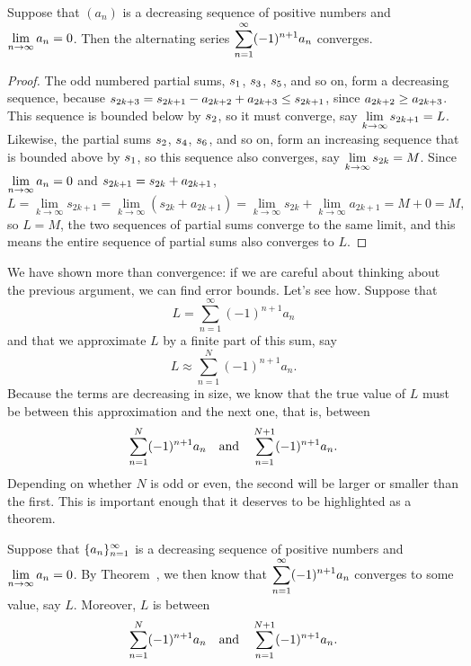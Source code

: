 \begin{theorem}
\label{thm:alternating-series-test}
Suppose that $(a_n)$ is a decreasing
sequence of positive numbers and $\displaystyle\lim_{n\to\infty}a_n=0$. Then the
alternating series $\displaystyle\sum_{n=1}^\infty (-1)^{n+1} a_n$ converges.
\end{theorem}



\begin{proof} The odd numbered partial sums, $\displaystyle s_1$, $\displaystyle s_3$, $\displaystyle s_5$,
and so on, form a decreasing sequence, because
$\displaystyle s_{2k+3}=s_{2k+1}-a_{2k+2}+a_{2k+3}\le s_{2k+1}$, since
$\displaystyle a_{2k+2}\ge a_{2k+3}$. This sequence is bounded below by
$\displaystyle s_2$, so it must converge, say 
$\displaystyle\lim_{k\to\infty}s_{2k+1}=L$.
Likewise, the partial sums $\displaystyle s_2$, $\displaystyle s_4$, $\displaystyle s_6$,
and so on, form an increasing sequence that is bounded above by
$\displaystyle s_1$, so this sequence also converges, say 
$\displaystyle\lim_{k\to\infty}s_{2k}=M$. Since $\displaystyle\lim_{n\to\infty} a_n=0$ and
$\displaystyle s_{2k+1}= s_{2k}+a_{2k+1}$,
$$
  L=\lim_{k\to\infty}s_{2k+1}=\lim_{k\to\infty}(s_{2k}+a_{2k+1})=
  \lim_{k\to\infty}s_{2k}+\lim_{k\to\infty}a_{2k+1}=M+0=M,
$$
so $L=M$, the two sequences of partial sums converge to the same
limit, and this means the entire sequence of partial sums also
converges to $L$.
\end{proof}

We have shown more than convergence: if we are careful about thinking
about the previous argument, we can find error bounds. Let's see
how. Suppose that
$$L=\sum_{n=1}^\infty (-1)^{n+1} a_n$$
and that we approximate $L$ by a finite part of this sum, say
$$L\approx \sum_{n=1}^N (-1)^{n+1} a_n.$$
Because the terms are decreasing in size, we know that the true value
of $L$ must be between this approximation and the next one, that is,
between 
$$
  \sum_{n=1}^N (-1)^{n+1} a_n \hbox{\quad and\quad}
  \sum_{n=1}^{N+1} (-1)^{n+1} a_n.
$$
Depending on whether $N$ is odd or even, the second will be larger or
smaller than the first.  This is important enough that it deserves to
be highlighted as a theorem.

\begin{theorem}
\label{thm:alternating-series-error-bounds}
  Suppose that $\displaystyle\{a_n\}_{n=1}^\infty$ is a decreasing sequence of
  positive numbers and $\displaystyle\lim_{n\to\infty}a_n=0$. By
  Theorem~, we then know that
  $\displaystyle\sum_{n=1}^\infty (-1)^{n+1} a_n$ converges to some value, say
  $L$.  Moreover, $L$ is between
  $$
  \sum_{n=1}^N (-1)^{n+1} a_n \hbox{\quad and\quad}
  \sum_{n=1}^{N+1} (-1)^{n+1} a_n.
  $$
\end{theorem}




